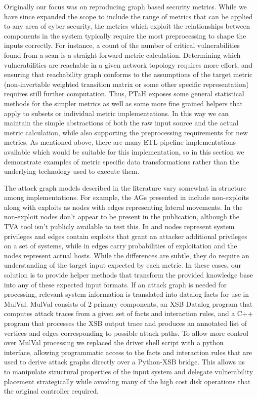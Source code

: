 
Originally our focus was on reproducing graph based security metrics. While we have since expanded the scope to include the range of metrics that can be applied to any area of cyber security, the metrics which exploit the relationships between components in the system typically require the most preprocessing to shape the inputs correctly. For instance, a count of the number of critical vulnerabilities found from a scan is a straight forward metric calculation. Determining which vulnerabilities are reachable in a given network topology requires more effort, and ensuring that reachability graph conforms to the assumptions of the target metric (non-invertable weighted transition matrix or some other specific representation) requires still further computation. Thus, PTaH exposes some general statistical methods for the simpler metrics as well as some more fine grained helpers that apply to subsets or individual metric implementations. In this way we can maintain the simple abstractions of both the raw input source and the actual metric calculation, while also supporting the preprocessing requirements for new metrics. As mentioned above, there are many ETL pipeline implementations available which would be suitable for this implementation, so in this section we demonstrate examples of metric specific data transformations rather than the underlying technology used to execute them. 

The attack graph models described in the literature vary somewhat in structure among implementations. For example, the AGs presented in \cite{Ou_Appel_2005} include non-exploits along with exploits as nodes with edges representing lateral movements. In \cite{Noel_Jajodia_2014} the non-exploit nodes don't appear to be present in the publication, although the TVA tool isn't publicly available to test this. In \cite{Dacier_1994} and \cite{Ortalo_1999} nodes represent system privileges and edges contain exploits that grant an attacker additional privileges on a set of systems, while in \cite{Phillips_Swiler_1998} edges carry probabilities of exploitation and the nodes represent actual hosts. While the differences are subtle, they do require an understanding of the target input expected by each metric. In these cases, our solution is to provide helper methods that transform the provided knowledge base into any of these expected input formats. If an attack graph is needed for processing, relevant system information is translated into datalog facts for use in MulVal\cite{Ou_Appel_2005}. MulVal consists of 2 primary components, an XSB Datalog program that computes attack traces from a given set of facts and interaction rules, and a C++ program that processes the XSB output trace and produces an annotated list of vertices and edges corresponding to possible attack paths. To allow more control over MulVal processing we replaced the driver shell script with a python interface, allowing programmatic access to the facts and interaction rules that are used to derive attack graphs directly over a Python-XSB bridge. This allows us to manipulate structural properties of the input system and delegate vulnerability placement strategically while avoiding many of the high cost disk operations that the original controller required. 



